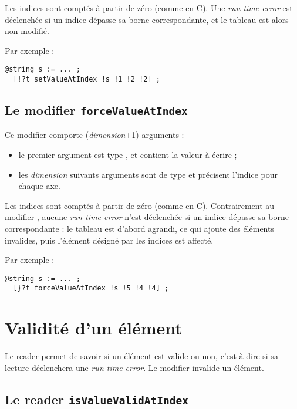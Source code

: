 Les indices sont comptés à partir de zéro (comme en C). Une \emph{run-time error} est déclenchée si un indice dépasse sa borne correspondante, et le tableau est alors non modifié.

Par exemple :
\begin{lstlisting}[language=galgas]
  @string s := ... ;
  [!?t setValueAtIndex !s !1 !2 !2] ;
\end{lstlisting}





\subsection{Le modifier \texttt{forceValueAtIndex}}

Ce modifier comporte (\emph{dimension}+1) arguments :
\begin{itemize}
  \item le premier argument est type , et contient la valeur à écrire ;
  \item les \emph{dimension} suivants arguments sont de type  et précisent l'indice pour chaque axe.
\end{itemize} 
  
Les indices sont comptés à partir de zéro (comme en C). Contrairement au modifier , aucune \emph{run-time error} n'est déclenchée si un indice dépasse sa borne correspondante : le tableau est d'abord agrandi, ce qui ajoute des éléments invalides, puis l'élément désigné par les indices est affecté.

Par exemple :
\begin{lstlisting}[language=galgas]
  @string s := ... ;
  [}?t forceValueAtIndex !s !5 !4 !4] ;
\end{lstlisting}





\section{Validité d'un élément}

Le reader  permet de savoir si un élément est valide ou non, c'est à dire si sa lecture déclenchera une \emph{run-time error}. Le modifier  invalide un élément.

\subsection{Le reader \texttt{isValueValidAtIndex}}

